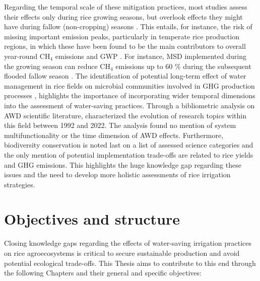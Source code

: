 
Regarding the temporal scale of these mitigation practices, most studies assess their effects only during rice growing seasons, but overlook effects they might have during fallow (non-cropping) seasons \citep{qian2023}. This entails, for instance, the risk of missing important emission peaks, particularly in temperate rice production regions, in which these have been found to be the main contributors to overall year-round CH$_{4}$ emissions and GWP \citep{haque2015, martinez-eixarch2018}. For instance, MSD implemented during the growing season can reduce CH$_{4}$ emissions up to 60 \% during the subsequent flooded fallow season \citep{martinez-eixarch2022}. The identification of potential long-term effect of water management in rice fields on microbial communities involved in GHG production processes \citep{lagomarsino2016}, highlights the importance of incorporating wider temporal dimensions into the assessment of water-saving practices. Through a bibliometric analysis on AWD scientific literature, \citep{vuciterna2024} characterized the evolution of research topics within this field between 1992 and 2022. The analysis found no mention of system multifunctionality or the time dimension of AWD effects. Furthermore, biodiversity conservation is noted last on a list of assessed science categories and the only mention of potential implementation trade-offs are related to rice yields and GHG emissions. This highlights the huge knowledge gap regarding these issues and the need to develop more holistic assessments of rice irrigation strategies.\\

\section*{Objectives and structure}

Closing knowledge gaps regarding the effects of water-saving irrigation practices on rice agroecosystems is critical to secure sustainable production and avoid potential ecological trade-offs. This Thesis aims to contribute to this end through the following Chapters and their general and specific objectives:

